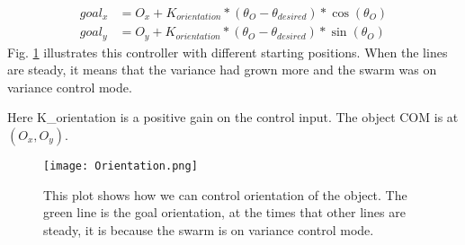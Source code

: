 \begin{align}\nonumber
goal_x &= O_x +  K_{orientation} * ( \theta_O - \theta_{desired} ) * \cos(\theta_O)\\
goal_y &= O_y +  K_{orientation} * ( \theta_O - \theta_{desired} ) * \sin(\theta_O)
\end{align}
Fig. \ref{fig:OrientCont} illustrates this controller with different starting positions. When the lines are steady, it means that the variance had grown more and the swarm was on variance control mode.

Here K_{orientation} is a positive gain on the control input.  The object COM is at $(O_x,O_y)$.
\begin{figure}
\begin{center}
	\texttt{[image: Orientation.png]}
\end{center}
\vspace{-1em}
\caption{\label{fig:OrientCont}
This plot shows how we can control orientation of the object. The green line is the goal orientation, at the times that other lines are steady, it is because the swarm is on variance control mode.
}
\vspace{-1em}
\end{figure}


